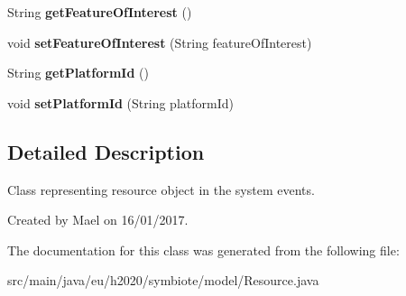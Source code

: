 \begin{DoxyCompactItemize}
\item 
String {\bfseries get\+Feature\+Of\+Interest} ()\hypertarget{classeu_1_1h2020_1_1symbiote_1_1model_1_1Resource_a1e5912a2e60f0d2dcda674f26ebe871b}{}\label{classeu_1_1h2020_1_1symbiote_1_1model_1_1Resource_a1e5912a2e60f0d2dcda674f26ebe871b}

\item 
void {\bfseries set\+Feature\+Of\+Interest} (String feature\+Of\+Interest)\hypertarget{classeu_1_1h2020_1_1symbiote_1_1model_1_1Resource_abcfd5b3b2e1515ca7e9eb50eeb7ed0cf}{}\label{classeu_1_1h2020_1_1symbiote_1_1model_1_1Resource_abcfd5b3b2e1515ca7e9eb50eeb7ed0cf}

\item 
String {\bfseries get\+Platform\+Id} ()\hypertarget{classeu_1_1h2020_1_1symbiote_1_1model_1_1Resource_a97e847fb787ea9fe1d16d8bd702deece}{}\label{classeu_1_1h2020_1_1symbiote_1_1model_1_1Resource_a97e847fb787ea9fe1d16d8bd702deece}

\item 
void {\bfseries set\+Platform\+Id} (String platform\+Id)\hypertarget{classeu_1_1h2020_1_1symbiote_1_1model_1_1Resource_a4f3c37b066d6e6587912fa1f1240048f}{}\label{classeu_1_1h2020_1_1symbiote_1_1model_1_1Resource_a4f3c37b066d6e6587912fa1f1240048f}

\end{DoxyCompactItemize}


\subsection{Detailed Description}
Class representing resource object in the system events.

Created by Mael on 16/01/2017. 

The documentation for this class was generated from the following file\+:\begin{DoxyCompactItemize}
\item 
src/main/java/eu/h2020/symbiote/model/Resource.\+java\end{DoxyCompactItemize}

